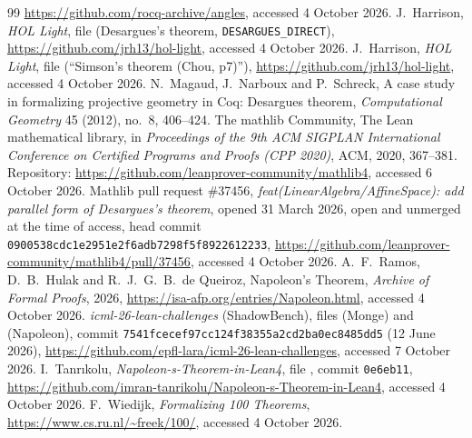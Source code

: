 \documentclass[11pt]{article}
\theoremstyle{definition}
\theoremstyle{remark}
\newcommand{\lean}[1]{\texttt{#1}}
\begin{document}
\begin{thebibliography}{99}
\url{https://github.com/rocq-archive/angles}, accessed 4 October 2026.
 J.~Harrison, \emph{HOL Light}, file  (Desargues's
theorem, \lean{DESARGUES\_DIRECT}), \url{https://github.com/jrh13/hol-light}, accessed 4 October
2026.
 J.~Harrison, \emph{HOL Light}, file 
(``Simson's theorem (Chou, p7)''), \url{https://github.com/jrh13/hol-light}, accessed 4 October
2026.
 N.~Magaud, J.~Narboux and P.~Schreck, A case study in formalizing projective
geometry in Coq: Desargues theorem, \emph{Computational Geometry} 45 (2012), no.~8, 406--424.
 The mathlib Community, The Lean mathematical library, in \emph{Proceedings of the
9th ACM SIGPLAN International Conference on Certified Programs and Proofs (CPP 2020)}, ACM, 2020,
367--381. Repository: \url{https://github.com/leanprover-community/mathlib4}, accessed 6 October
2026.
 Mathlib pull request \#37456, \emph{feat(LinearAlgebra/AffineSpace): add
parallel form of Desargues's theorem}, opened 31 March 2026, open and unmerged at the time of
access, head commit \texttt{0900538cdc1e2951e2f6adb7298f5f8922612233},
\url{https://github.com/leanprover-community/mathlib4/pull/37456}, accessed 4 October 2026.
 A.~F.~Ramos, D.~B.~Hulak and R.~J.~G.~B.~de Queiroz, Napoleon's Theorem,
\emph{Archive of Formal Proofs}, 2026, \url{https://isa-afp.org/entries/Napoleon.html}, accessed
4 October 2026.
 \emph{icml-26-lean-challenges} (ShadowBench), files
 (Monge) and
 (Napoleon),
commit \texttt{7541fcecef97cc124f38355a2cd2ba0ec8485dd5} (12 June 2026),
\url{https://github.com/epfl-lara/icml-26-lean-challenges}, accessed 7 October 2026.
 I.~Tanr\i{}kolu, \emph{Napoleon-s-Theorem-in-Lean4}, file
, commit \texttt{0e6eb11}, \url{https://github.com/imran-tanrikolu/Napoleon-s-Theorem-in-Lean4},
accessed 4 October 2026.
 F.~Wiedijk, \emph{Formalizing 100 Theorems},
\url{https://www.cs.ru.nl/~freek/100/}, accessed 4 October 2026.
\end{thebibliography}
\end{document}

